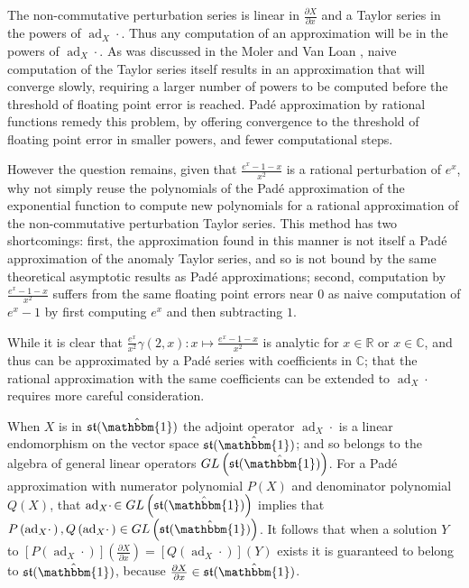 The non-commutative perturbation series is linear in $\frac{\partial X}{\partial x}$  and a 
Taylor series in the powers of $\operatorname{ad}_X \cdotp$. Thus any computation of an 
approximation will be in the powers of $\operatorname{ad}_X \cdotp$. As was discussed in the 
Moler and Van Loan \cite{moler_nineteen_1978,moler_nineteen_2003}, naive computation of the 
Taylor series itself results in an approximation that will converge slowly, requiring a
larger number of powers to be computed before the threshold of floating point error is 
reached. Pad\'{e} approximation by rational functions remedy this problem, by offering 
convergence to the threshold of floating point error in smaller powers, and fewer 
computational steps.

However the question remains, given that $\frac{e^{x} -1 - x}{x^2}$ is a rational 
perturbation of $e^x$, why not simply reuse the polynomials of the Pad\'{e} approximation of 
the exponential function to compute new polynomials for a rational approximation of the 
non-commutative perturbation Taylor series. This method has two shortcomings: first, the 
approximation found in this manner is not itself a Pad\'{e} approximation of the anomaly 
Taylor series, and so is not bound by the same theoretical asymptotic results as Pad\'{e} 
approximations; second, computation by $\frac{e^{x} - 1 - x}{x^2}$ suffers from the same 
floating point errors near $0$ as naive computation of $e^x - 1$ by first computing $e^x$ 
and then subtracting $1$.

While it is clear that $\frac{e^x}{x^2}\gamma\left(2,x\right) : x \mapsto \frac{e^{x} -1 - x}{x^2}$ 
is analytic for $x \in \mathbb{R}$ or $x \in \mathbb{C}$, and thus can be approximated by a 
Pad\'{e} series with coefficients in $\mathbb{C}$; that the rational approximation with the 
same coefficients can be extended to $\operatorname{ad}_X \cdotp$ requires more careful 
consideration.

When $X$ is in $\mathfrak{st}(\hat{\mathbbm{1}})$ the adjoint operator $\operatorname{ad}_X \cdotp$
is a linear endomorphism on the vector space $\mathfrak{st}(\hat{\mathbbm{1}})$; and so 
belongs to the algebra of general linear operators $GL\left(\mathfrak{st}(\hat{\mathbbm{1}})\right)$. 
For a Pad\'{e} approximation with numerator polynomial $P\left(X\right)$ and denominator 
polynomial $Q\left(X\right)$, that $\operatorname{ad}_X \cdotp \in GL\left(\mathfrak{st}(\hat{\mathbbm{1}})\right)$
implies that $P\left(\operatorname{ad}_X \cdotp\right), Q\left(\operatorname{ad}_X \cdotp\right) \in GL\left(\mathfrak{st}(\hat{\mathbbm{1}})\right)$.
It follows that when a solution $Y$ to $\left[P\left(\operatorname{ad}_X \cdotp\right)\right] \left(\frac{\partial X}{\partial x}\right) = \left[Q\left(\operatorname{ad}_X \cdotp\right)\right] \left(Y\right) $
exists it is guaranteed to belong to $\mathfrak{st}(\hat{\mathbbm{1}})$, because $\frac{\partial X}{\partial x} \in \mathfrak{st}(\hat{\mathbbm{1}})$.

